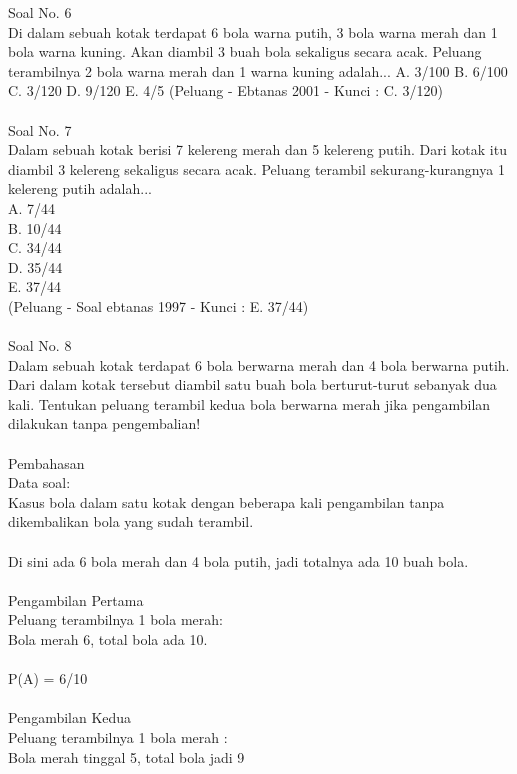 \documentclass[11pt,fleqn]{book} %
\begin{document}
Soal No. 6\\
Di dalam sebuah kotak terdapat 6 bola warna putih, 3 bola warna merah dan 1 bola warna kuning. Akan diambil 3 buah bola sekaligus secara acak. Peluang terambilnya 2 bola warna merah dan 1 warna kuning adalah...
A. 3/100 
B. 6/100 
C. 3/120 
D. 9/120 
E. 4/5 
(Peluang - Ebtanas 2001 - Kunci : C. 3/120) \\
\\
Soal No. 7\\ 
Dalam sebuah kotak berisi 7 kelereng merah dan 5 kelereng putih. Dari kotak itu diambil 3 kelereng sekaligus secara acak. Peluang terambil sekurang-kurangnya 1 kelereng putih adalah...\\
A. 7/44 \\
B. 10/44 \\
C. 34/44 \\
D. 35/44 \\
E. 37/44 \\
(Peluang - Soal ebtanas 1997 - Kunci : E. 37/44)\\
\\
Soal No. 8\\
Dalam sebuah kotak terdapat 6 bola berwarna merah dan 4 bola berwarna putih. Dari dalam kotak tersebut diambil satu buah bola berturut-turut sebanyak dua kali. Tentukan peluang terambil kedua bola berwarna merah jika pengambilan dilakukan tanpa pengembalian! \\
\\
Pembahasan\\
Data soal:\\
Kasus bola dalam satu kotak dengan beberapa kali pengambilan tanpa dikembalikan bola yang sudah terambil.\\
\\
Di sini ada 6 bola merah dan 4 bola putih, jadi totalnya ada 10 buah bola.\\
\\
Pengambilan Pertama\\
Peluang terambilnya 1 bola merah:\\
Bola merah 6, total bola ada 10.\\
\\
P(A) = 6/10 \\
\\
Pengambilan Kedua\\
Peluang terambilnya 1 bola merah :\\
Bola merah tinggal 5, total bola jadi 9\\\\
\\
\end{document}
